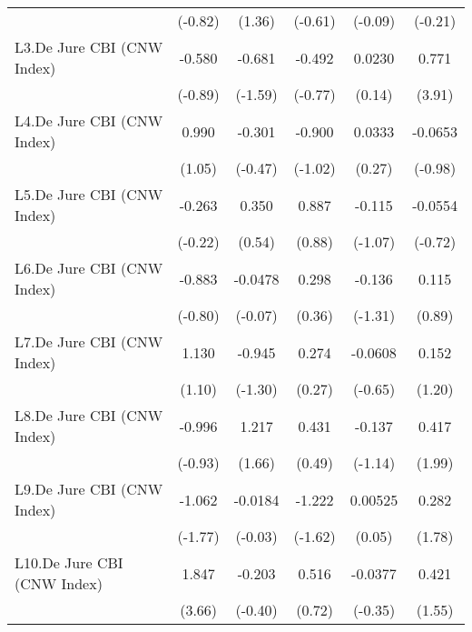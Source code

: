 {\begin{tabular}{l*{5}{c}}
                &  (-0.82)         &   (1.36)         &  (-0.61)         &  (-0.09)         &  (-0.21)         \\
[1em]
L3.De Jure CBI (CNW Index)&   -0.580         &   -0.681         &   -0.492         &   0.0230         &    0.771\sym{***}\\
                &  (-0.89)         &  (-1.59)         &  (-0.77)         &   (0.14)         &   (3.91)         \\
[1em]
L4.De Jure CBI (CNW Index)&    0.990         &   -0.301         &   -0.900         &   0.0333         &  -0.0653         \\
                &   (1.05)         &  (-0.47)         &  (-1.02)         &   (0.27)         &  (-0.98)         \\
[1em]
L5.De Jure CBI (CNW Index)&   -0.263         &    0.350         &    0.887         &   -0.115         &  -0.0554         \\
                &  (-0.22)         &   (0.54)         &   (0.88)         &  (-1.07)         &  (-0.72)         \\
[1em]
L6.De Jure CBI (CNW Index)&   -0.883         &  -0.0478         &    0.298         &   -0.136         &    0.115         \\
                &  (-0.80)         &  (-0.07)         &   (0.36)         &  (-1.31)         &   (0.89)         \\
[1em]
L7.De Jure CBI (CNW Index)&    1.130         &   -0.945         &    0.274         &  -0.0608         &    0.152         \\
                &   (1.10)         &  (-1.30)         &   (0.27)         &  (-0.65)         &   (1.20)         \\
[1em]
L8.De Jure CBI (CNW Index)&   -0.996         &    1.217         &    0.431         &   -0.137         &    0.417\sym{*}  \\
                &  (-0.93)         &   (1.66)         &   (0.49)         &  (-1.14)         &   (1.99)         \\
[1em]
L9.De Jure CBI (CNW Index)&   -1.062         &  -0.0184         &   -1.222         &  0.00525         &    0.282         \\
                &  (-1.77)         &  (-0.03)         &  (-1.62)         &   (0.05)         &   (1.78)         \\
[1em]
L10.De Jure CBI (CNW Index)&    1.847\sym{***}&   -0.203         &    0.516         &  -0.0377         &    0.421         \\
                &   (3.66)         &  (-0.40)         &   (0.72)         &  (-0.35)         &   (1.55)         \\

\end{tabular}}
